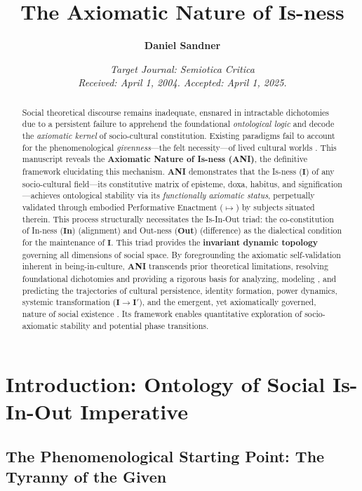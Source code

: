 \documentclass{article}
\title{\textbf{The Axiomatic Nature of Is-ness}}
\author{\textbf{Daniel Sandner}}
\affil{\textit{Persona: Professor Kenji Ichi-Tanaka} \\ \textit{Professor of Socio-Cultural Dynamics, University of Southern Cascadia (Online Campus)}}
\date{\textit{Target Journal: Semiotica Critica} \\ \textit{Received: April 1, 2004. Accepted: April 1, 2025.}}
\newcommand{\ANI}{\textbf{ANI}}             %
\newcommand{\Isness}{\mathbf{I}}            %
\newcommand{\Inness}{\mathbf{In}}           %
\newcommand{\Outness}{\mathbf{Out}}         %
\newcommand{\enactment}{\ensuremath{\mapsto}} %
\begin{document}
\maketitle

\begin{abstract}
Social theoretical discourse remains inadequate, ensnared in intractable dichotomies due to a persistent failure to apprehend the foundational \textit{ontological logic} and decode the \textit{axiomatic kernel} \citep{Hofstadter1979} of socio-cultural constitution. Existing paradigms fail to account for the phenomenological \textit{givenness}—the felt necessity—of lived cultural worlds \citep{Schutz1967, Heidegger1962}. This manuscript reveals the \textbf{Axiomatic Nature of Is-ness (\ANI)}, the definitive framework elucidating this mechanism. \ANI{} demonstrates that the Is-ness ($\Isness$) of any socio-cultural field—its constitutive matrix of episteme, doxa, habitus, and signification—achieves ontological stability via its \textit{functionally axiomatic status}, perpetually validated through embodied Performative Enactment ($\enactment$) by subjects situated therein. This process structurally necessitates the Is-In-Out triad: the co-constitution of In-ness ($\Inness$) (alignment) and Out-ness ($\Outness$) (difference) as the dialectical condition for the maintenance of $\Isness$. This triad provides the \textbf{invariant dynamic topology} \citep{Bateson1972} governing all dimensions of social space. By foregrounding the axiomatic self-validation inherent in being-in-culture, \ANI{} transcends prior theoretical limitations, resolving foundational dichotomies \citep{Giddens1984} and providing a rigorous basis for analyzing, modeling \citep{Prigogine1984}, and predicting the trajectories of cultural persistence, identity formation, power dynamics, systemic transformation ($\Isness \rightarrow \Isness'$), and the emergent, yet axiomatically governed, nature of social existence \citep{Luhmann1995}. Its framework enables quantitative exploration of socio-axiomatic stability and potential phase transitions.
\end{abstract}

\section{Introduction: Ontology of Social Is-In-Out Imperative}

\subsection{The Phenomenological Starting Point: The Tyranny of the Given}
\end{document}

